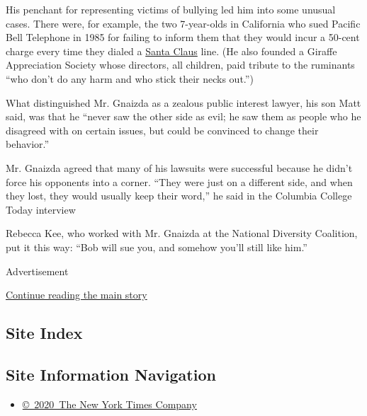 His penchant for representing victims of bullying led him into some
unusual cases. There were, for example, the two 7-year-olds in
California who sued Pacific Bell Telephone in 1985 for failing to inform
them that they would incur a 50-cent charge every time they dialed a
\href{https://www.nytimes3xbfgragh.onion/1985/03/28/us/around-the-nation-santa-claus-phone-line-brings-10-million-suit.html}{Santa
Claus} line. (He also founded a Giraffe Appreciation Society whose
directors, all children, paid tribute to the ruminants ``who don't do
any harm and who stick their necks out.'')

What distinguished Mr. Gnaizda as a zealous public interest lawyer, his
son Matt said, was that he ``never saw the other side as evil; he saw
them as people who he disagreed with on certain issues, but could be
convinced to change their behavior.''

Mr. Gnaizda agreed that many of his lawsuits were successful because he
didn't force his opponents into a corner. ``They were just on a
different side, and when they lost, they would usually keep their
word,'' he said in the Columbia College Today interview

Rebecca Kee, who worked with Mr. Gnaizda at the National Diversity
Coalition, put it this way: ``Bob will sue you, and somehow you'll still
like him.''

Advertisement

\protect\hyperlink{after-bottom}{Continue reading the main story}

\hypertarget{site-index}{%
\subsection{Site Index}\label{site-index}}

\hypertarget{site-information-navigation}{%
\subsection{Site Information
Navigation}\label{site-information-navigation}}

\begin{itemize}
\tightlist
\item
  \href{https://help.nytimes3xbfgragh.onion/hc/en-us/articles/115014792127-Copyright-notice}{©~2020~The
  New York Times Company}
\end{itemize}

